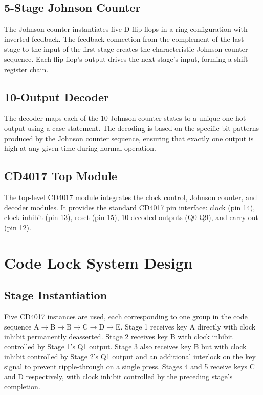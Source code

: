 \documentclass[12pt,a4paper]{report}
\begin{document}
\subsection{5-Stage Johnson Counter}

The Johnson counter instantiates five D flip-flops in a ring configuration with inverted feedback. The feedback connection from the complement of the last stage to the input of the first stage creates the characteristic Johnson counter sequence. Each flip-flop's output drives the next stage's input, forming a shift register chain.

\subsection{10-Output Decoder}

The decoder maps each of the 10 Johnson counter states to a unique one-hot output using a case statement. The decoding is based on the specific bit patterns produced by the Johnson counter sequence, ensuring that exactly one output is high at any given time during normal operation.

\subsection{CD4017 Top Module}

The top-level CD4017 module integrates the clock control, Johnson counter, and decoder modules. It provides the standard CD4017 pin interface: clock (pin 14), clock inhibit (pin 13), reset (pin 15), 10 decoded outputs (Q0-Q9), and carry out (pin 12).

\section{Code Lock System Design}

\subsection{Stage Instantiation}

Five CD4017 instances are used, each corresponding to one group in the code sequence A$\rightarrow$B$\rightarrow$B$\rightarrow$C$\rightarrow$D$\rightarrow$E. Stage 1 receives key A directly with clock inhibit permanently deasserted. Stage 2 receives key B with clock inhibit controlled by Stage 1's Q1 output. Stage 3 also receives key B but with clock inhibit controlled by Stage 2's Q1 output and an additional interlock on the key signal to prevent ripple-through on a single press. Stages 4 and 5 receive keys C and D respectively, with clock inhibit controlled by the preceding stage's completion.
\end{document}

